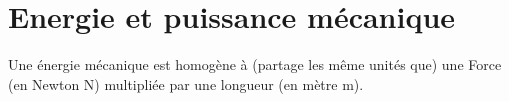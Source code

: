 \documentclass[10pt,fleqn]{article} %
\begin{document}
%
%
%
%
%
%
%
%
%
%
%
%
%
%
%
%

\section{Energie et puissance mécanique}
Une énergie mécanique est homogène à (partage les même unités que) une Force (en Newton N) multipliée par une longueur (en mètre m).
\end{document}
